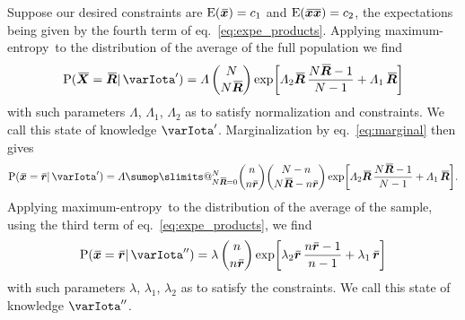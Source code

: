 \documentclass{article}
\makeatletter
\theoremstyle{remark}
\theoremstyle{innote}
\def\sum{\DOTSI\sumop\slimits@}
\renewcommand*{\|}{\mathpunct{|}}%
\newcommand*{\p}{\mathrm{P}}%
\newcommand*{\eqn}{eq.}%
\newcommand*{\E}{\mathrm{E}}
\DeclarePairedDelimiter\expp{(}{)}
\newcommand*{\expe}{\E\expp}%
\theoremstyle{simple}
\newcommand*{\widebar}[1]{{\mkern1.5mu\skew{2}\overline{\mkern-1.5mu#1\mkern-1.5mu}\mkern 1.5mu}}
\newcommand*{\av}{\widebar} %
\newcommand*{\sav}{\widebar} %
\newcommand*{\yxx}{x}%
\newcommand*{\yx}{\bm{\yxx}}%
\newcommand*{\yxs}{\sav{\yx}}%
\newcommand*{\yX}{\bm{X}}%
\newcommand*{\yXf}{\av{\yX}}%
\newcommand*{\yxxs}{\sav{\yx\yx}}%
\newcommand*{\yr}{\bm{r}}%
\newcommand*{\yrs}{\sav{\yr}}%
\newcommand*{\yR}{\bm{R}}%
\newcommand*{\yRf}{\av{\yR}}%
\newcommand*{\yHa}{\varIota'}
\newcommand*{\yHb}{\varIota''}
\newcommand*{\yL}{\varLambda}
\newcommand*{\yl}{\lambda}
\newcommand*{\me}{maximum-entropy}
\makeatother
\begin{document}
Suppose our desired constraints are $\expe{\yxs } = c_1$ and
$\expe{\yxxs} = c_2$, the expectations being given by the fourth term of
\eqn~\eqref{eq:expe_products}. Applying \me\ to the distribution of the
average of the full population we find
\begin{equation}
  \label{eq:full_pop_av_example_ME}
  \p(\yXf = \yRf \| \yHa)  = \yL\,
\binom{N}{N \yRf}\exp\biggl[
\yL_2 \yRf \,\frac{N \yRf-1}{N-1} + \yL_1\, \yRf\biggr]
\end{equation}
with such parameters $\yL$, $\yL_1$, $\yL_2$ as to satisfy normalization
and constraints. We call this state of knowledge $\yHa$. Marginalization by
\eqn~\eqref{eq:marginal} then gives
\begin{equation}
  \label{eq:full_pop_av_example_ME_marg}
  \p(\yxs = \yrs \| \yHa)  = \yL
  \sum_{N\yRf=0}^N
  \binom{n}{n\yrs} \binom{N-n}{N\yRf-n\yrs} \exp\biggl[
\yL_2 \yRf \,\frac{N \yRf-1}{N-1} + \yL_1\, \yRf\biggr].
\end{equation}
Applying \me\ to the distribution of the average of the sample, using the
third term of \eqn~\eqref{eq:expe_products}, we find
\begin{equation}
  \label{eq:sample_av_example_ME}
  \p(\yxs = \yrs \| \yHb)  = \yl\,
  \binom{n}{n\yrs}
  \exp\biggl[\yl_2 \yrs \,\frac{n \yrs-1}{n-1} + \yl_1\, \yrs\biggr]
\end{equation}
with such parameters $\yl$, $\yl_1$, $\yl_2$ as to satisfy the constraints.
We call this state of knowledge $\yHb$.
\end{document}
